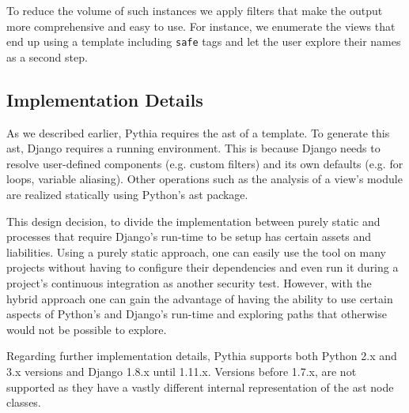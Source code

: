 To reduce the volume of such instances
we apply filters that make the output
more comprehensive and easy to use.
For instance,
we enumerate the views that end up
using a template including {\tt safe} tags
and let the user explore their names as a
second step.

\vspace{-1.5mm}

\subsection{Implementation Details}
\label{sec:implementation}

As we described earlier,
Pythia requires the {\sc ast} of a template.
To generate this {\sc ast},
Django requires a running environment.
This is because Django needs to resolve
user-defined components (e.g. custom filters)
and its own defaults (e.g. for loops, variable aliasing).
Other operations such as the analysis of a view's
module are realized statically using Python's
{\sc ast} package.

This design decision, to divide the implementation
between purely static and processes that require
Django's run-time to be setup has certain
assets and liabilities.
Using a purely static approach,
one can easily use the tool on many projects
without having to configure their dependencies
and even run it during a project's continuous
integration as another security test.
However,
with the hybrid approach one can gain the
advantage of having the ability to use
certain aspects of Python's and Django's
run-time and exploring paths that
otherwise would not be possible to explore. 

Regarding further implementation details, 
Pythia supports both Python 2.x and 3.x
versions and Django 1.8.x until 1.11.x. Versions 
before 1.7.x, are not supported as they have a
vastly different internal representation
of the {\sc ast} node classes.
\vspace{-1.5mm}
